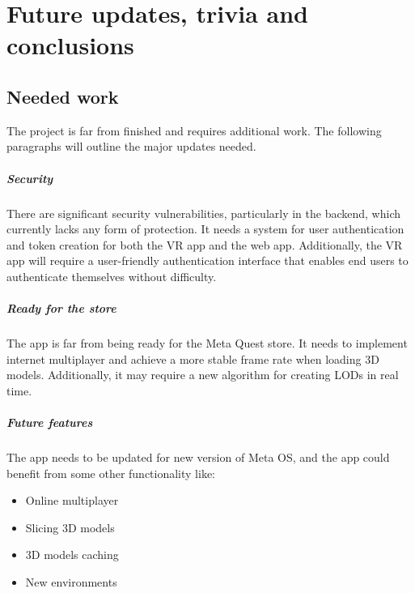 
\chapter{Future updates, trivia and conclusions}
\label{chp:conclusions}

\section{Needed work}
\noindent
The project is far from finished and requires additional work. The following paragraphs will outline the major updates needed.

\paragraph{Security}
There are significant security vulnerabilities, particularly in the backend, which currently lacks any form of protection. It needs a system for user authentication and token creation for both the \ac{VR} app and the web app.
Additionally, the \ac{VR} app will require a user-friendly authentication interface that enables end users to authenticate themselves without difficulty.

\paragraph{Ready for the store}
The app is far from being ready for the Meta Quest store. It needs to implement internet multiplayer and achieve a more stable frame rate when loading 3D models.
Additionally, it may require a new algorithm for creating \ac{LOD}s in real time.

\paragraph{Future features}
The app needs to be updated for new version of Meta OS, and the app could benefit from some other functionality like:

\begin{itemize}
  \item Online multiplayer
  \item	Slicing 3D models
  \item	3D models caching 
  \item	New environments
\end{itemize}

